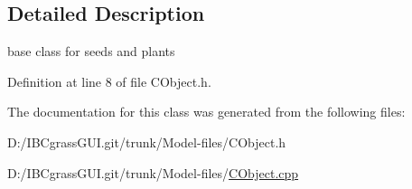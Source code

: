 \subsection{Detailed Description}
base class for seeds and plants 

Definition at line 8 of file C\+Object.\+h.



The documentation for this class was generated from the following files\+:\begin{DoxyCompactItemize}
\item 
D\+:/\+I\+B\+Cgrass\+G\+U\+I.\+git/trunk/\+Model-\/files/C\+Object.\+h\item 
D\+:/\+I\+B\+Cgrass\+G\+U\+I.\+git/trunk/\+Model-\/files/\mbox{\hyperlink{_c_object_8cpp}{C\+Object.\+cpp}}\end{DoxyCompactItemize}
